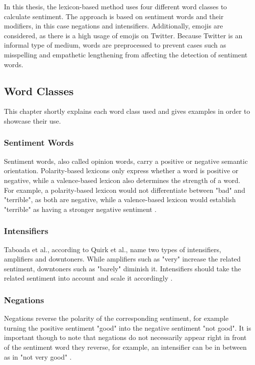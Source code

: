 In this thesis, the lexicon-based method uses four different word classes to calculate sentiment. The approach is based on sentiment words and their modifiers, in this case negations and intensifiers. Additionally, emojis are considered, as there is a high usage of emojis on Twitter. Because Twitter is an informal type of medium, words are preprocessed to prevent cases such as misspelling and empathetic lengthening from affecting the detection of sentiment words.

\subsection{Word Classes}
This chapter shortly explains each word class used and gives examples in order to showcase their use.

\subsubsection{Sentiment Words}
Sentiment words, also called opinion words, carry a positive or negative semantic orientation. Polarity-based lexicons only express whether a word is positive or negative, while a valence-based lexicon also determines the strength of a word. For example, a polarity-based lexicon would not differentiate between "bad" and "terrible", as both are negative, while a valence-based lexicon would establish "terrible" as having a stronger negative sentiment \cite{DBLP:conf/icwsm/HuttoG14}.

\subsubsection{Intensifiers}
Taboada et al., according to Quirk et al., name two types of intensifiers, amplifiers and downtoners. While amplifiers such as "very" increase the related sentiment, downtoners such as "barely" diminish it. Intensifiers should take the related sentiment into account and scale it accordingly \cite{taboada}.

\subsubsection{Negations}
Negations reverse the polarity of the corresponding sentiment, for example turning the positive sentiment "good" into the negative sentiment "not good". It is important though to note that negations do not necessarily appear right in front of the sentiment word they reverse, for example, an intensifier can be in between as in "not very good" \cite{taboada}.

